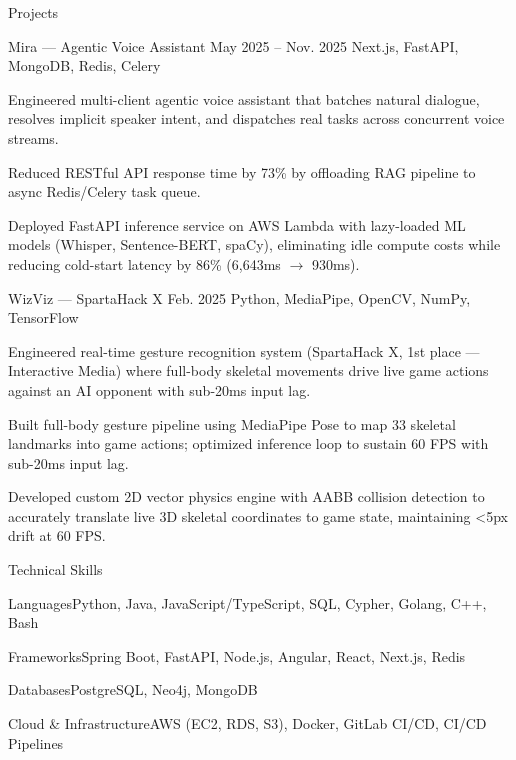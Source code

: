 \documentclass[
	11pt
]{../../../resume}
\begin{document}
	\begin{rSection}{P}{rojects}
		\begin{rSectionEntry}
			{Mira --- Agentic Voice Assistant}
			{May 2025 -- Nov. 2025}
			{}
			{Next.js, FastAPI, MongoDB, Redis, Celery}
			{}

			\item Engineered multi-client agentic voice assistant that batches natural dialogue, resolves implicit speaker intent, and dispatches real tasks across concurrent voice streams.
			\item Reduced RESTful API response time by 73\% by offloading RAG pipeline to async Redis/Celery task queue.
			\item Deployed FastAPI inference service on AWS Lambda with lazy-loaded ML models (Whisper, Sentence-BERT, spaCy), eliminating idle compute costs while reducing cold-start latency by 86\% (6{,}643ms $\rightarrow$ 930ms).
		\end{rSectionEntry}

		\begin{rSectionEntry}
			{WizViz --- SpartaHack X}
			{Feb. 2025}
			{}
			{Python, MediaPipe, OpenCV, NumPy, TensorFlow}
			{}

			\item Engineered real-time gesture recognition system (SpartaHack X, 1st place — Interactive Media) where full-body skeletal movements drive live game actions against an AI opponent with sub-20ms input lag.
			\item Built full-body gesture pipeline using MediaPipe Pose to map 33 skeletal landmarks into game actions; optimized inference loop to sustain 60 FPS with sub-20ms input lag.
			\item Developed custom 2D vector physics engine with AABB collision detection to accurately translate live 3D skeletal coordinates to game state, maintaining \textless5px drift at 60 FPS.
		\end{rSectionEntry}
	\end{rSection}

	\begin{rSection}{T}{echnical Skills}
		\begin{rSet}{Languages}{Python, Java, JavaScript/TypeScript, SQL, Cypher, Golang, C++, Bash}
		\end{rSet}
		\begin{rSet}{Frameworks}{Spring Boot, FastAPI, Node.js, Angular, React, Next.js, Redis}
		\end{rSet}
		\begin{rSet}{Databases}{PostgreSQL, Neo4j, MongoDB}
		\end{rSet}
		\begin{rSet}{Cloud \& Infrastructure}{AWS (EC2, RDS, S3), Docker, GitLab CI/CD, CI/CD Pipelines}
		\end{rSet}
	\end{rSection}
\end{document}
